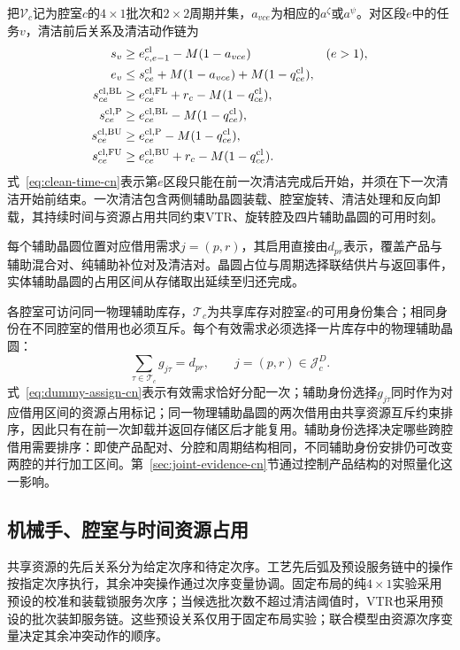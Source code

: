 \documentclass[final,5p,times,twocolumn]{elsarticle}
\begin{document}
把$\mathcal V_c$记为腔室$c$的$4\times1$批次和$2\times2$周期并集，$a_{vce}$为相应的$a^{\zeta}$或$a^{\psi}$。对区段$e$中的任务$v$，清洁前后关系及清洁动作链为
\begin{equation}
\begin{aligned}
s_v&\ge e^{\rm cl}_{c,e-1}-M(1-a_{vce}) &&(e>1),\\
e_v&\le s^{\rm cl}_{ce}+M(1-a_{vce})+M(1-q^{\rm cl}_{ce}),\\
s^{\rm cl,BL}_{ce}&\ge e^{\rm cl,FL}_{ce}+r_c-M(1-q^{\rm cl}_{ce}),\\
s^{\rm cl,P}_{ce}&\ge e^{\rm cl,BL}_{ce}-M(1-q^{\rm cl}_{ce}),\\
s^{\rm cl,BU}_{ce}&\ge e^{\rm cl,P}_{ce}-M(1-q^{\rm cl}_{ce}),\\
s^{\rm cl,FU}_{ce}&\ge e^{\rm cl,BU}_{ce}+r_c-M(1-q^{\rm cl}_{ce}).
\end{aligned}
\label{eq:clean-time-cn}
\end{equation}
式~\eqref{eq:clean-time-cn}表示第$e$区段只能在前一次清洁完成后开始，并须在下一次清洁开始前结束。一次清洁包含两侧辅助晶圆装载、腔室旋转、清洁处理和反向卸载，其持续时间与资源占用共同约束VTR、旋转腔及四片辅助晶圆的可用时刻。

每个辅助晶圆位置对应借用需求$j=(p,r)$，其启用直接由$d_{pr}$表示，覆盖产品与辅助混合对、纯辅助补位对及清洁对。晶圆占位与周期选择联结供片与返回事件，实体辅助晶圆的占用区间从存储取出延续至归还完成。

各腔室可访问同一物理辅助库存，$\mathcal T_c$为共享库存对腔室$c$的可用身份集合；相同身份在不同腔室的借用也必须互斥。每个有效需求必须选择一片库存中的物理辅助晶圆：
\begin{equation}
\sum_{\tau\in\mathcal T_c}g_{j\tau}=d_{pr},
\qquad j=(p,r)\in\mathcal J_c^D.
\label{eq:dummy-assign-cn}
\end{equation}
式~\eqref{eq:dummy-assign-cn}表示有效需求恰好分配一次；辅助身份选择$g_{j\tau}$同时作为对应借用区间的资源占用标记；同一物理辅助晶圆的两次借用由共享资源互斥约束排序，因此只有在前一次卸载并返回存储区后才能复用。辅助身份选择决定哪些跨腔借用需要排序：即使产品配对、分腔和周期结构相同，不同辅助身份安排仍可改变两腔的并行加工区间。第~\ref{sec:joint-evidence-cn}节通过控制产品结构的对照量化这一影响。

\subsection{机械手、腔室与时间资源占用}

共享资源的先后关系分为给定次序和待定次序。工艺先后弧及预设服务链中的操作按指定次序执行，其余冲突操作通过次序变量协调。固定布局的纯$4\times1$实验采用预设的校准和装载锁服务次序；当候选批次数不超过清洁阈值时，VTR也采用预设的批次装卸服务链。这些预设关系仅用于固定布局实验；联合模型由资源次序变量决定其余冲突动作的顺序。
\end{document}
